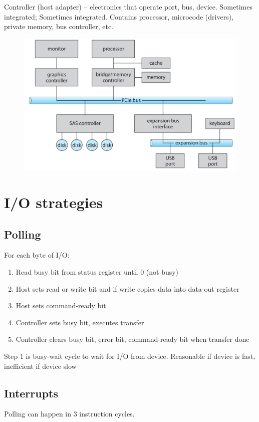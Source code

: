 Controller (host adapter) – electronics that operate port,
bus, device. Sometimes integrated; Sometimes integrated. Contains processor, microcode (drivers), private memory,
bus controller, etc.

\begin{figure}[h!]
    \centering
    \includegraphics[width=0.55\linewidth]{img/dvdsvvds.png}
\end{figure}

\newpage
\section{I/O strategies }

\subsection{Polling}

For each byte of I/O:

\begin{enumerate}
    \item Read busy bit from status register until 0 (not busy)
    \item Host sets read or write bit and if write copies data into data-out register
    \item Host sets command-ready bit
    \item Controller sets busy bit, executes transfer
    \item Controller clears busy bit, error bit, command-ready bit when transfer done
\end{enumerate}

Step 1 is busy-wait cycle to wait for I/O from device. Reasonable if device is fast, inefficient if device slow

\subsection{Interrupts}

Polling can happen in 3 instruction cycles.



